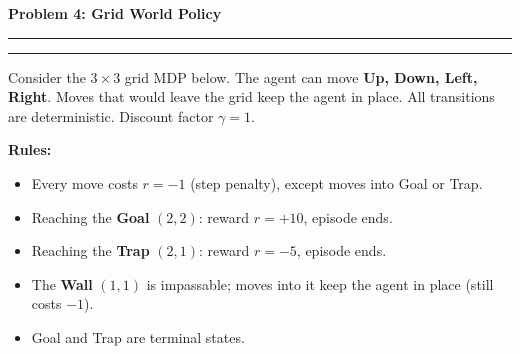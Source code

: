 \documentclass[12pt]{article}
\newcommand{\question}[1]{%
  \clearpage
  \vspace{0.5cm}
  {\noindent\normalsize \textbf{#1}}
  \vspace{0.2cm}
  \hrule
  \vspace{0.1cm}
  \hrule
  \vspace{0.3cm}
}
\begin{document}

\question{Problem 4: Grid World Policy}\label{prob:grid}

Consider the $3 \times 3$ grid MDP below. The agent can move \textbf{Up, Down, Left, Right}. Moves that would leave the grid keep the agent in place. All transitions are deterministic. Discount factor $\gamma = 1$.

\begin{center}
\end{center}

\textbf{Rules:}
\begin{itemize}[nosep]
\item Every move costs $r = -1$ (step penalty), except moves into Goal or Trap.
\item Reaching the \textbf{Goal} $(2,2)$: reward $r = +10$, episode ends.
\item Reaching the \textbf{Trap} $(2,1)$: reward $r = -5$, episode ends.
\item The \textbf{Wall} $(1,1)$ is impassable; moves into it keep the agent in place (still costs $-1$).
\item Goal and Trap are terminal states.
\end{itemize}
\end{document}
